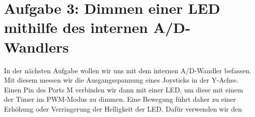 \documentclass{article}
\begin{document}
\section{Aufgabe 3: Dimmen einer LED mithilfe des internen A/D-Wandlers}

In der nächsten Aufgabe wollen wir uns mit dem internen A/D-Wandler befassen. Mit diesem messen wir die Ausgangsspannung eines Joysticks in der Y-Achse. Einen Pin des Ports M verbinden wir dann mit einer LED, um diese mit einem der Timer im PWM-Modus zu dimmen. Eine Bewegung führt daher zu einer Erhöhung oder Verringerung der Helligkeit der LED. Dafür verwenden wir den
\end{document}
